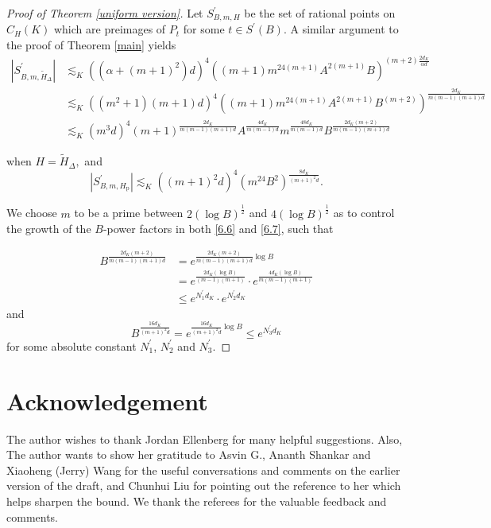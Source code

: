 \documentclass[12pt]{amsart}
\theoremstyle{definition}
\theoremstyle{remark}
\numberwithin{equation}{section}
\begin{document}
\begin{proof}[Proof of Theorem \ref{uniform version}]
	Let $S^{\prime}_{B,m,H}$ be the set of rational points on $C_{H}(K)$ which are preimages of $P_t$ for some $t \in S^{\prime}(B).$ A similar argument to the proof of Theorem \ref{main} yields 
	\begin{align}
	|S^{\prime}_{B, m, \tilde{H}_{\Delta}}| & \lesssim_{K} ((\alpha + (m+1)^{2}) d)^{4}((m+1)m^{24(m+1)}A^{2(m+1)}B)^{(m+2)\frac{2d_{K}}{\alpha d}}  \\
	 & \lesssim_{K} ((m^{2}+1)(m+1)d)^{4}((m+1)m^{24(m+1)}A^{2(m+1)}B^{(m+2)})^{\frac{2d_{K}}{m(m-1)(m+1)d}}\\
	 & \lesssim_{K} (m^{3}d)^{4}(m+1)^{\frac{2d_K}{m(m-1)(m+1) d}}A^{\frac{4d_{K}}{m(m-1)d}}m^{\frac{48d_{K}}{m(m-1)d}}B^{\frac{2d_{K}(m+2)}{m(m-1)(m+1)d}}\label{6.6}
	 \end{align} 
	 
	 when $H=\tilde{H}_{\Delta},$
	 and
	 \begin{equation}\label{6.7}
	 	|S^{\prime}_{B, m, H_{\operatorname{p}}}| \lesssim_{K} ((m+1)^{2}d)^{4}(m^{24}B^{2})^{\frac{8d_{K}}{(m+1)^{2}d}}.
	 \end{equation}
	
	We choose $m$ to be a prime between $2(\log B)^{\frac{1}{2}}$ and $4(\log B)^{\frac{1}{2}}$ as to control the growth of the $B$-power factors in both \ref{6.6} and \ref{6.7}, such that 
		
	\begin{align*}
B^{\frac{2d_{K}(m+2)}{m(m-1)(m+1)d}} &=e^{\frac{2d_{K}(m+2)}{m(m-1)(m+1)d} \log B} \\
&= e^{\frac{2d_{K} (\log B)}{(m-1)(m+1)}} \cdot e^{\frac{4d_{K} (\log B)}{m(m-1)(m+1)}} \\
&\le e^{N^{\prime}_{1}d_{K}} \cdot e^{N^{\prime}_{2}d_{K}}
\end{align*}
and  
$$
B^{\frac{16d_{K}}{(m+1)^{2}d}} = e^{\frac{16d_{K}}{(m+1)^{2}d} \log B} \le e^{N^{\prime}_{3}d_{K}}
$$
for some absolute constant $N^{\prime}_{1}$, $N^{\prime}_{2}$ and $N^{\prime}_{3}$. 
	\end{proof}


\section*{Acknowledgement} The author wishes to thank Jordan Ellenberg for many helpful suggestions. Also, The author wants to show her gratitude to Asvin G., Ananth Shankar and Xiaoheng (Jerry) Wang for the useful conversations and comments on the earlier version of the draft, and Chunhui Liu for pointing out the reference \cite{PS22} to her which helps sharpen the bound. We thank the referees for the valuable feedback and comments.
\end{document}

